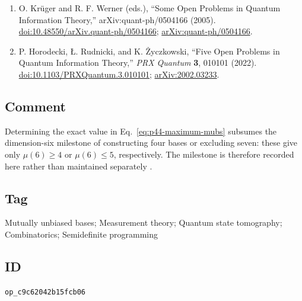 \begin{enumerate}[label={},leftmargin=4.8em,labelsep=0.5em]
  \item[\textup{[KW05]}]\label{ref:p44-krueger-werner}
  O. Kr\"uger and R. F. Werner (eds.),
  ``Some Open Problems in Quantum Information Theory,''
  arXiv:quant-ph/0504166 (2005).
  \href{https://doi.org/10.48550/arXiv.quant-ph/0504166}%
       {doi:10.48550/arXiv.quant-ph/0504166};
  \href{https://arxiv.org/abs/quant-ph/0504166}%
       {arXiv:quant-ph/0504166}.

  \item[\textup{[HRZ22]}]\label{ref:p44-horodecki-et-al}
  P. Horodecki, \L. Rudnicki, and K. \.{Z}yczkowski,
  ``Five Open Problems in Quantum Information Theory,''
  \emph{PRX Quantum} \textbf{3}, 010101 (2022).
  \href{https://doi.org/10.1103/PRXQuantum.3.010101}%
       {doi:10.1103/PRXQuantum.3.010101};
  \href{https://arxiv.org/abs/2002.03233}{arXiv:2002.03233}.
\end{enumerate}

\subsection*{Comment}

Determining the exact value in Eq.~\eqref{eq:p44-maximum-mubs} subsumes the
dimension-six milestone of constructing four bases or excluding seven: these
give only $\mu(6)\geq4$ or $\mu(6)\leq5$, respectively.  The milestone is
therefore recorded here rather than maintained separately
.

\subsection*{Tag}

Mutually unbiased bases; Measurement theory; Quantum state tomography;
Combinatorics; Semidefinite programming

\subsection*{ID}

\texttt{op\_c9c62042b15fcb06}
